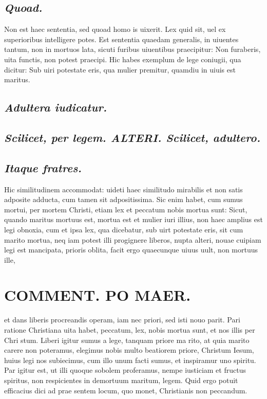 \documentclass{article}
\begin{document}
\begin{pages}
\subsection*{\textit{Quoad. }}\pstart Non est haec sententia, sed quoad homo is uixerit. Lex quid sit, uel ex superioribus intelligere potes. Est sententia quaedam generalis, in uiuentes tantum, non in mortuos lata, sicuti furibus uiuentibus praecipitur: Non furaberis, uita functis, non potest praecipi. Hic habes exemplum de lege coniugii, qua dicitur: Sub uiri potestate eris, qua mulier premitur, quamdiu in uiuis est maritus.   \pend
{}
{}
\subsection*{\textit{Adultera iudicatur. }}
{}
\subsection*{\textit{Scilicet, per legem. ALTERI. Scilicet, adultero.  }}
{}
\subsection*{\textit{Itaque fratres. }}\pstart Hic similitudinem accommodat: uideti haec similitudo mirabilis et non satis adposite adducta, cum tamen sit adpositissima. Sic enim habet, cum sumus mortui, per mortem Christi, etiam lex et peccatum nobis mortua sunt: Sicut, quando maritus mortuus est, mortua est et mulier iuri illius, non haec amplius est legi obnoxia, cum et ipsa lex, qua dicebatur, sub uirt potestate eris, sit cum marito mortua, neq iam potest illi progignere liberos, nupta alteri, nouae cuipiam legi est mancipata, prioris oblita, facit ergo quaecunque uiuus uult, non mortuus ille,  \pend
\section*{COMMENT. PO MAER.  }\pstart et dans liberis procreandis operam, iam nec priori, sed isti nouo parit. Pari ratione Christiana uita habet, peccatum, lex, nobis mortua sunt, et nos illis per Chri stum. Liberi igitur sumus a lege, tanquam priore ma rito, at quia marito carere non poteramus, elegimus nobis multo beatiorem priore, Christum Iesum, huius legi nos subiecimus, cum illo unum facti sumus, et inspiramur uno spiritu. Par igitur est, ut illi quoque sobolem proferamus, nempe iusticiam et fructus spiritus, non respicientes in demortuum maritum, legem. Quid ergo potuit efficacius dici ad prae sentem locum, quo monet, Christianis non peccandum.  \pend
{}
{}

\end{pages}
\end{document}
